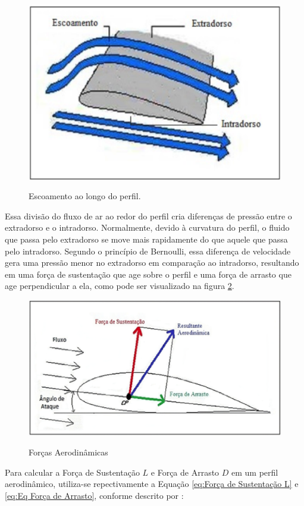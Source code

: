         \begin{figure}
            \centering
            \caption{Escoamento ao longo do perfil.}
            \includegraphics[width=0.5\linewidth]{Figuras//Teorico/EscoamentoCirculandoOPerfil.png}
            \label{fig:Escoamento_ao_longo_do_perfil}
        \end{figure}

        \par Essa divisão do fluxo de ar ao redor do perfil cria diferenças de pressão entre o extradorso e o intradorso. Normalmente, devido à curvatura do perfil, o fluido que passa pelo extradorso se move mais rapidamente do que aquele que passa pelo intradorso. Segundo o princípio de Bernoulli, essa diferença de velocidade gera uma pressão menor no extradorso em comparação ao intradorso, resultando em uma força de sustentação que age sobre o perfil e uma força de arrasto que age perpendicular a ela, como pode ser visualizado na figura \ref{fig:Forças_Aerodinâmicas}.

        \begin{figure}
            \centering
            \caption{Forças Aerodinâmicas}
            \includegraphics[width=0.8\linewidth]{Figuras//Teorico/Esforços Aerodinâmicos.png}
            \label{fig:Forças_Aerodinâmicas}
        \end{figure}

        \par Para calcular a Força de Sustentação \textbf{\( L  \)} e Força de Arrasto \textbf{\( D \)} em um perfil aerodinâmico, utiliza-se repectivamente a Equação \ref{eq:Força de Sustentação L} e \ref{eq:Eq Força de Arrasto}, conforme descrito por :

